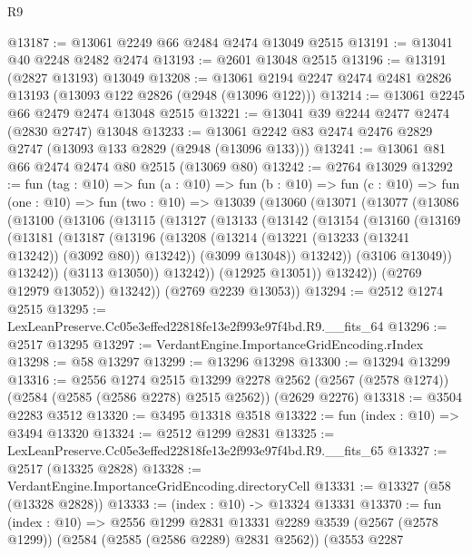 \begin{lexlean}{R9}
\begin{coremodule}
@13187 := @13061 @2249 @66 @2484 @2474 @13049 @2515
@13191 := @13041 @40 @2248 @2482 @2474
@13193 := @2601 @13048 @2515
@13196 := @13191 (@2827 @13193) @13049
@13208 := @13061 @2194 @2247 @2474 @2481 @2826 @13193 (@13093 @122 @2826 (@2948 (@13096 @122)))
@13214 := @13061 @2245 @66 @2479 @2474 @13048 @2515
@13221 := @13041 @39 @2244 @2477 @2474 (@2830 @2747) @13048
@13233 := @13061 @2242 @83 @2474 @2476 @2829 @2747 (@13093 @133 @2829 (@2948 (@13096 @133)))
@13241 := @13061 @81 @66 @2474 @2474 @80 @2515 (@13069 @80)
@13242 := @2764 @13029
@13292 := fun (tag : @10) =>
  fun (a : @10) =>
  fun (b : @10) =>
  fun (c : @10) =>
  fun (one : @10) =>
  fun (two : @10) =>
  @13039
    (@13060
      (@13071
        (@13077
          (@13086
            (@13100
              (@13106
                (@13115
                  (@13127
                    (@13133
                      (@13142
                        (@13154
                          (@13160
                            (@13169
                              (@13181
                                (@13187
                                  (@13196
                                    (@13208
                                      (@13214 (@13221 (@13233 (@13241 @13242)) (@3092 @80)) @13242))
                                    (@3099 @13048))
                                  @13242))
                              (@3106 @13049))
                            @13242))
                        (@3113 @13050))
                      @13242))
                  (@12925 @13051))
                @13242))
            (@2769 @12979 @13052))
          @13242))
      (@2769 @2239 @13053))
@13294 := @2512 @1274 @2515
@13295 := LexLeanPreserve.Cc05e3effed22818fe13e2f993e97f4bd.R9.__fits_64
@13296 := @2517 @13295
@13297 := VerdantEngine.ImportanceGridEncoding.rIndex
@13298 := @58 @13297
@13299 := @13296 @13298
@13300 := @13294 @13299
@13316 := @2556
    @1274
    @2515
    @13299
    @2278
    @2562
    (@2567 (@2578 @1274))
    (@2584 (@2585 (@2586 @2278) @2515 @2562))
    (@2629 @2276)
@13318 := @3504 @2283 @3512
@13320 := @3495 @13318 @3518
@13322 := fun (index : @10) => @3494 @13320
@13324 := @2512 @1299 @2831
@13325 := LexLeanPreserve.Cc05e3effed22818fe13e2f993e97f4bd.R9.__fits_65
@13327 := @2517 (@13325 @2828)
@13328 := VerdantEngine.ImportanceGridEncoding.directoryCell
@13331 := @13327 (@58 (@13328 @2828))
@13333 := (index : @10) -> @13324 @13331
@13370 := fun (index : @10) =>
  @2556
    @1299
    @2831
    @13331
    @2289
    @3539
    (@2567 (@2578 @1299))
    (@2584 (@2585 (@2586 @2289) @2831 @2562))
    (@3553
      @2287

\end{coremodule}
\end{lexlean}
